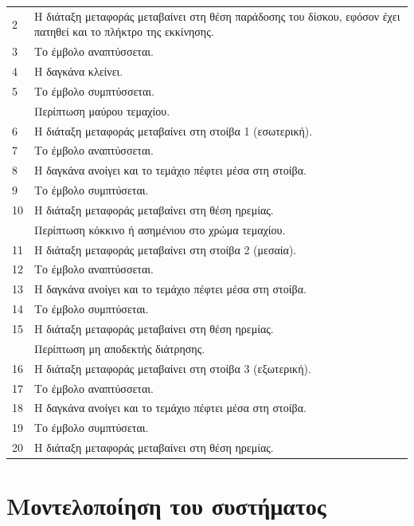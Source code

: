 \documentclass[a4paper,12pt,twoside]{report}
\begin{document}
\begin{longtable} { m{0.5cm} m{12cm} }
					2 & Η διάταξη μεταφοράς μεταβαίνει στη θέση παράδοσης του δίσκου, εφόσον έχει πατηθεί και το πλήκτρο της εκκίνησης.\\
					3 & Το έμβολο αναπτύσσεται.\\
					4 & Η δαγκάνα κλείνει.\\
					5 & Το έμβολο συμπτύσσεται.\\
					   & Περίπτωση μαύρου τεμαχίου.\\
					6 & Η διάταξη μεταφοράς μεταβαίνει στη στοίβα 1 (εσωτερική).\\
					7 & Το έμβολο αναπτύσσεται.\\
					8 & Η δαγκάνα ανοίγει και το τεμάχιο πέφτει μέσα στη στοίβα.\\
					9 & Το έμβολο συμπτύσεται.\\
					10 & Η διάταξη μεταφοράς μεταβαίνει στη θέση ηρεμίας.\\
					    & Περίπτωση κόκκινο ή ασημένιου στο χρώμα τεμαχίου.\\
					11 & Η διάταξη μεταφοράς μεταβαίνει στη στοίβα 2 (μεσαία).\\
					12 & Το έμβολο αναπτύσσεται.\\
					13 & Η δαγκάνα ανοίγει και το τεμάχιο πέφτει μέσα στη στοίβα.\\
					14 & Το έμβολο συμπτύσεται.\\
					15 & Η διάταξη μεταφοράς μεταβαίνει στη θέση ηρεμίας.\\
					    & Περίπτωση μη αποδεκτής διάτρησης.\\
					16 & Η διάταξη μεταφοράς μεταβαίνει στη στοίβα 3 (εξωτερική).\\
					17 & Το έμβολο αναπτύσσεται.\\
					18 & Η δαγκάνα ανοίγει και το τεμάχιο πέφτει μέσα στη στοίβα.\\
					19 & Το έμβολο συμπτύσεται.\\
					20 & Η διάταξη μεταφοράς μεταβαίνει στη θέση ηρεμίας.\\
					\hline
				\end{longtable}

		\section{Μοντελοποίηση του συστήματος}
		
\end{document}
